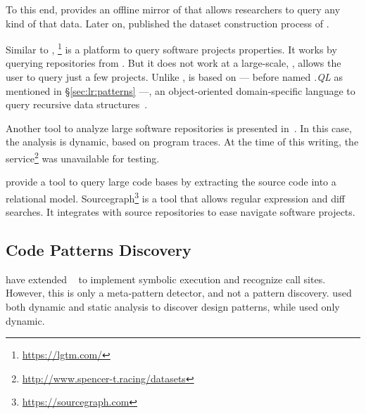 To this end, \cite{gousiosGHTorentDatasetTool2013} provides an offline mirror of \github{} that allows researchers to query any kind of that data.
Later on, \cite{gousiosLeanGHTorrentGitHub2014} published the dataset construction process of \github{}.

Similar to \boa{}, \lgtm{}\footnote{\url{https://lgtm.com/}} is a platform to query software projects properties.
It works by querying repositories from \github{}.
But it does not work at a large-scale, \ie{}, \lgtm{} allows the user to query just a few projects.
Unlike \boa{}, \lgtm{} is based on \ql{} --- before named \emph{.QL} as mentioned in \S\ref{sec:lr:patterns} ---, an object-oriented domain-specific language to query recursive data structures~\cite{avgustinovQLObjectorientedQueries2016}.


Another tool to analyze large software repositories is presented in~\cite{brandauerSpencerInteractiveHeap2017}.
In this case, the analysis is dynamic, based on program traces. 
At the time of this writing, the service\footnote{\url{http://www.spencer-t.racing/datasets}} was unavailable for testing. 

\cite{bajracharyaSourcererInternetscaleSoftware2009} provide a tool to query large code bases by extracting the source code into a relational model.
Sourcegraph\footnote{\url{https://sourcegraph.com}} is a tool that allows regular expression and diff searches.
It integrates with source repositories to ease navigate software projects.

\subsection*{Code Patterns Discovery }
\label{sec:lr:patterns}

\cite{posnettTHEXMiningMetapatterns2010} have extended \asm{}~\citep{brunetonASMCodeManipulation2002,kuleshovUsingASMFramework2007} to implement symbolic execution and recognize call sites.
However, this is only a meta-pattern detector, and not a pattern discovery.
\cite{huDynamicAnalysisDesign2008} used both dynamic and static analysis to discover design patterns, while \cite{arcelliDesignPatternDetection2008} used only dynamic.

